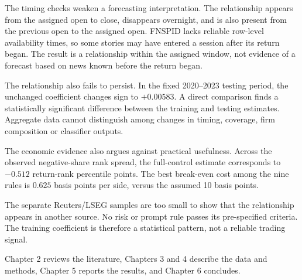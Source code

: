 The timing checks weaken a forecasting interpretation. The relationship appears
from the assigned open to close, disappears overnight, and is also present from
the previous open to the assigned open. FNSPID lacks reliable row-level
availability times, so some stories may have entered a session after its return
began. The result is a relationship within the assigned window, not evidence of
a forecast based on news known before the return began.

The relationship also fails to persist. In the fixed 2020--2023 testing period,
the unchanged coefficient changes sign to $+0.00583$. A direct comparison finds
a statistically significant difference between the training and testing
estimates. Aggregate data cannot distinguish among changes in timing, coverage,
firm composition or classifier outputs.

The economic evidence also argues against practical usefulness. Across the
observed negative-share rank spread, the full-control estimate corresponds to
$-0.512$ return-rank percentile points. The best break-even cost among the nine
rules is $0.625$ basis points per side, versus the assumed 10 basis points.

The separate Reuters/LSEG samples are too small to show that the relationship
appears in another source. No risk or prompt rule passes its pre-specified
criteria. The training coefficient is therefore a statistical pattern, not a
reliable trading signal.

Chapter 2 reviews the literature, Chapters 3 and 4 describe the data and
methods, Chapter 5 reports the results, and Chapter 6 concludes.
